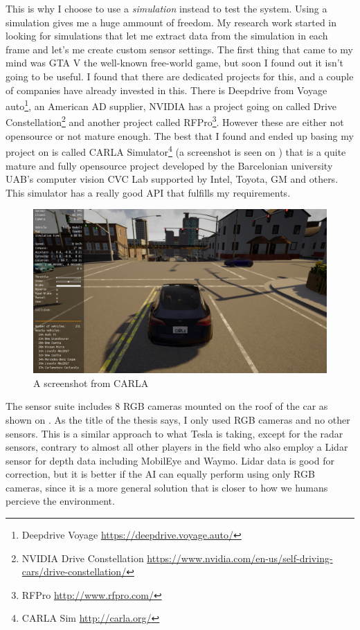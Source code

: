 This is why I choose to use a \emph{simulation} instead to test the system.
Using a simulation gives me a huge ammount of freedom. My research work started
in looking for simulations that let me extract data from the simulation in each
frame and let's me create custom sensor settings. The first thing that came to
my mind was GTA V the well-known free-world game, but soon I found out it isn't
going to be useful. I found that there are dedicated projects for this, and a
couple of companies have already invested in this. There is Deepdrive from
Voyage auto\footnote{Deepdrive Voyage \url{https://deepdrive.voyage.auto/}}, an
American AD supplier, NVIDIA has a project going on called Drive
Constellation\footnote{NVIDIA Drive Constellation
\url{https://www.nvidia.com/en-us/self-driving-cars/drive-constellation/}} and
another project called RFPro\footnote{RFPro \url{http://www.rfpro.com/}}.
However these are either not opensource or not mature enough. The best that I
found and ended up basing my project on is called CARLA Simulator\footnote{CARLA
Sim \url{http://carla.org/}} \cite{Dosovitskiy17} (a screenshot is seen on
) that is a quite mature and fully opensource project
developed by the Barcelonian university UAB's computer vision CVC Lab supported
by Intel, Toyota, GM and others. This simulator has a really good API that
fulfills my requirements.

\begin{figure}[!ht]
    \centering
    \includegraphics[width=150mm, keepaspectratio]{figures/carla.png}
    \caption{A screenshot from CARLA}
    \label{fig:carla}
\end{figure}

The sensor suite includes 8 RGB cameras mounted on the roof of the car as shown
on . As the title of the thesis says, I only used RGB
cameras and no other sensors. This is a similar approach to what Tesla is
taking, except for the radar sensors, contrary to almost all other players in
the field who also employ a Lidar sensor for depth data including MobilEye and
Waymo. Lidar data is good for correction, but it is better if the AI can equally
perform using only RGB cameras, since it is a more general solution that is
closer to how we humans percieve the environment.

